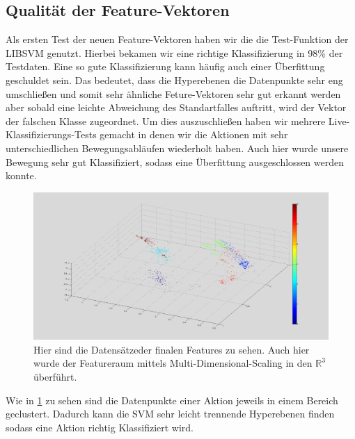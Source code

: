 \subsection{Qualität der Feature-Vektoren}
\label{subsec:qualitaet-der-feature-vektoren}
Als ersten Test der neuen Feature-Vektoren haben wir die die Test-Funktion der LIBSVM genutzt. Hierbei bekamen wir eine richtige Klassifizierung in 98\% der Testdaten. Eine so gute Klassifizierung kann häufig auch einer Überfittung geschuldet sein. Das bedeutet, dass die Hyperebenen die Datenpunkte sehr eng umschließen und somit sehr ähnliche Feture-Vektoren sehr gut erkannt werden aber sobald eine leichte Abweichung des Standartfalles auftritt, wird der Vektor der falschen Klasse zugeordnet. Um dies auszuschließen haben wir mehrere Live-Klassifizierungs-Tests gemacht in denen wir die Aktionen mit sehr unterschiedlichen Bewegungsabläufen wiederholt haben. Auch hier wurde unsere Bewegung sehr gut Klassifiziert, sodass eine Überfittung ausgeschlossen werden konnte.
\begin{figure}[hbtp]
\includegraphics[width=1.0\linewidth]{NewFeatures.png}
\caption{Hier sind die Datensätzeder finalen Features zu sehen. Auch hier wurde der Featureraum mittels Multi-Dimensional-Scaling in den $\mathbb{R}^3$ überführt.}
\label{fig:New-Features}
\end{figure}
Wie in \ref{fig:New-Features} zu sehen sind die Datenpunkte einer Aktion jeweils in einem Bereich geclustert. Dadurch kann die SVM sehr leicht trennende Hyperebenen finden sodass eine Aktion richtig Klassifiziert wird.

